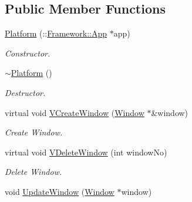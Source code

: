 \subsection*{Public Member Functions}
\begin{DoxyCompactItemize}
\item 
\hypertarget{classPlatform_1_1Platform_ad5671ca580e3f1a1af90dc5763640089}{
\hyperlink{classPlatform_1_1Platform_ad5671ca580e3f1a1af90dc5763640089}{Platform} (::\hyperlink{classFramework_1_1App}{Framework::App} $\ast$app)}
\label{classPlatform_1_1Platform_ad5671ca580e3f1a1af90dc5763640089}

\begin{DoxyCompactList}\small\item\em Constructor. \item\end{DoxyCompactList}\item 
\hypertarget{classPlatform_1_1Platform_ab81619febbd9ea3366cf3d53a9df2fa3}{
\hyperlink{classPlatform_1_1Platform_ab81619febbd9ea3366cf3d53a9df2fa3}{$\sim$Platform} ()}
\label{classPlatform_1_1Platform_ab81619febbd9ea3366cf3d53a9df2fa3}

\begin{DoxyCompactList}\small\item\em Destructor. \item\end{DoxyCompactList}\item 
\hypertarget{classPlatform_1_1Platform_a96954d83cf1d45af06a2f5b04d8014e8}{
virtual void \hyperlink{classPlatform_1_1Platform_a96954d83cf1d45af06a2f5b04d8014e8}{VCreateWindow} (\hyperlink{classPlatform_1_1Window}{Window} $\ast$\&window)}
\label{classPlatform_1_1Platform_a96954d83cf1d45af06a2f5b04d8014e8}

\begin{DoxyCompactList}\small\item\em Create Window. \item\end{DoxyCompactList}\item 
\hypertarget{classPlatform_1_1Platform_a91d6ee47e74480248cbf84e645a46b0b}{
virtual void \hyperlink{classPlatform_1_1Platform_a91d6ee47e74480248cbf84e645a46b0b}{VDeleteWindow} (int windowNo)}
\label{classPlatform_1_1Platform_a91d6ee47e74480248cbf84e645a46b0b}

\begin{DoxyCompactList}\small\item\em Delete Window. \item\end{DoxyCompactList}\item 
\hypertarget{classPlatform_1_1Platform_a09580992ef017f63e350a723e026ce9c}{
void \hyperlink{classPlatform_1_1Platform_a09580992ef017f63e350a723e026ce9c}{UpdateWindow} (\hyperlink{classPlatform_1_1Window}{Window} $\ast$window)}
\label{classPlatform_1_1Platform_a09580992ef017f63e350a723e026ce9c}


\end{DoxyCompactItemize}
